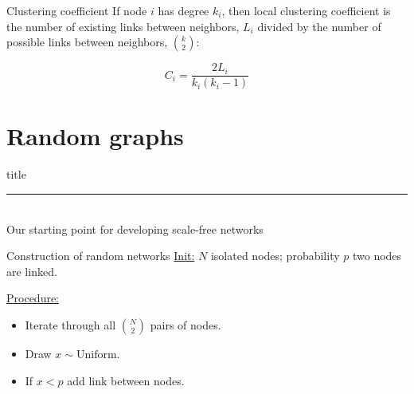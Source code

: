 \documentclass[notes]{beamer}
\begin{document}
\begin{frame}{Clustering coefficient}
  If node $i$ has degree $k_i$, then local clustering coefficient is
  the number of existing links between neighbors, $L_i$ divided by 
  the number of possible links between neighbors, ${k \choose 2}$:

  \[ C_i = \frac{2 L_i}{k_i(k_i - 1)} \]
\end{frame}




\section{Random graphs}
\begin{frame}[plain]
  \vfill
  \centering
  \begin{beamercolorbox}[sep=8pt,center,shadow=true,rounded=true]{title}
    \insertsectionhead\par%
    \color{oxfordblue}\noindent\rule{10cm}{1pt} \\[1em]

    \centering
    Our starting point for developing scale-free networks

  \end{beamercolorbox}
\end{frame}

\begin{frame}{Construction of random networks}
  \underline{Init:} $N$ isolated nodes; probability $p$ two nodes are linked.

  \underline{Procedure:} 
  \begin{itemize}
    \item Iterate through all ${N \choose 2}$ pairs of nodes.
    \item Draw $x \sim \text{Uniform}$. 
    \item If $x < p$ add link between nodes. 
  \end{itemize}
\end{frame}
\end{document}
